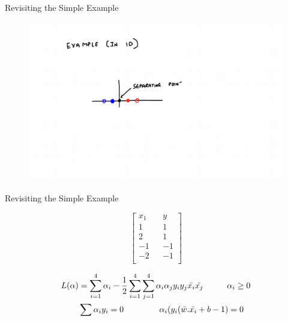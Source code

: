 \documentclass{beamer}
\begin{document}
\begin{frame}{Revisiting the Simple Example}
\begin{figure}
\includegraphics[scale = 0.5]{SVM/Svm-21.pdf}
\end{figure}
\end{frame}
\begin{frame}{Revisiting the Simple Example}


\begin{equation*}
\begin{bmatrix}
x_{1} && y \\
1 && 1\\
2 && 1\\
-1 && -1\\
-2 && -1\\
\end{bmatrix}
\end{equation*}

\begin{align*}
L(\alpha) &= \sum_{i=1}^{4} \alpha_{i} - \frac{1}{2}\sum_{i=1}^{4}\sum_{j=1}^{4}\alpha_{i}\alpha_{j}y_{i}y_{j}\bar{x_i}\bar{x_j} \hspace{1cm}\alpha_{i} \geq 0 \\
&\sum \alpha_{i}y_{i} = 0 \hspace{1.5cm}
\alpha_{i}(y_{i}(\bar{w}.\bar{x_i} + b - 1) = 0
\end{align*}

\end{frame}
\end{document}
